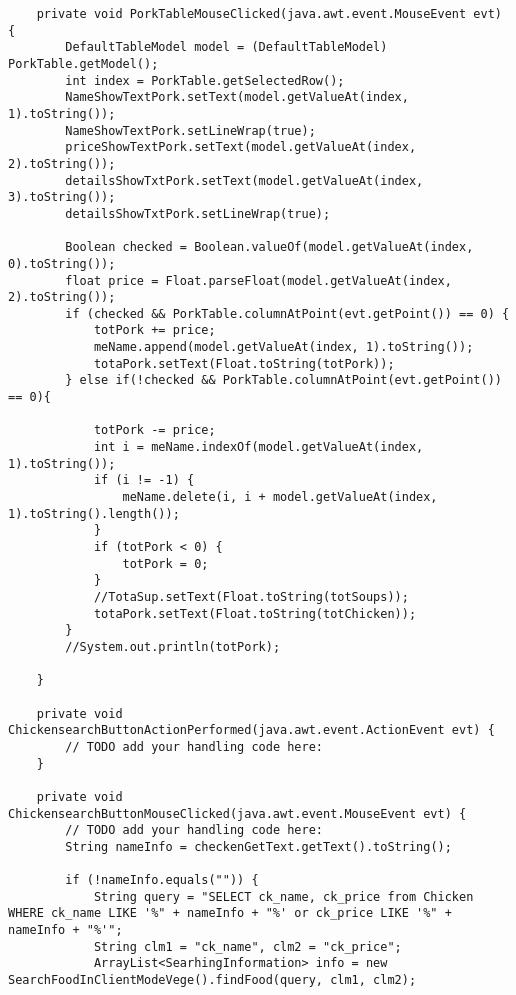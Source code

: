 \documentclass[12pt,a4paper]{article}
\begin{document}
\begin{lstlisting}
    private void PorkTableMouseClicked(java.awt.event.MouseEvent evt) {                                       
        DefaultTableModel model = (DefaultTableModel) PorkTable.getModel();
        int index = PorkTable.getSelectedRow();
        NameShowTextPork.setText(model.getValueAt(index, 1).toString());
        NameShowTextPork.setLineWrap(true);
        priceShowTextPork.setText(model.getValueAt(index, 2).toString());
        detailsShowTxtPork.setText(model.getValueAt(index, 3).toString());
        detailsShowTxtPork.setLineWrap(true);

        Boolean checked = Boolean.valueOf(model.getValueAt(index, 0).toString());
        float price = Float.parseFloat(model.getValueAt(index, 2).toString());
        if (checked && PorkTable.columnAtPoint(evt.getPoint()) == 0) {
            totPork += price;
            meName.append(model.getValueAt(index, 1).toString());
            totaPork.setText(Float.toString(totPork));
        } else if(!checked && PorkTable.columnAtPoint(evt.getPoint()) == 0){
            
            totPork -= price;
            int i = meName.indexOf(model.getValueAt(index, 1).toString());
            if (i != -1) {
                meName.delete(i, i + model.getValueAt(index, 1).toString().length());
            }
            if (totPork < 0) {
                totPork = 0;
            }
            //TotaSup.setText(Float.toString(totSoups));
            totaPork.setText(Float.toString(totChicken));
        }
        //System.out.println(totPork);

    }                                      

    private void ChickensearchButtonActionPerformed(java.awt.event.ActionEvent evt) {                                                    
        // TODO add your handling code here:
    }                                                   

    private void ChickensearchButtonMouseClicked(java.awt.event.MouseEvent evt) {                                                 
        // TODO add your handling code here:
        String nameInfo = checkenGetText.getText().toString();

        if (!nameInfo.equals("")) {
            String query = "SELECT ck_name, ck_price from Chicken WHERE ck_name LIKE '%" + nameInfo + "%' or ck_price LIKE '%" + nameInfo + "%'";
            String clm1 = "ck_name", clm2 = "ck_price";
            ArrayList<SearhingInformation> info = new SearchFoodInClientModeVege().findFood(query, clm1, clm2);


\end{lstlisting}
\end{document}
